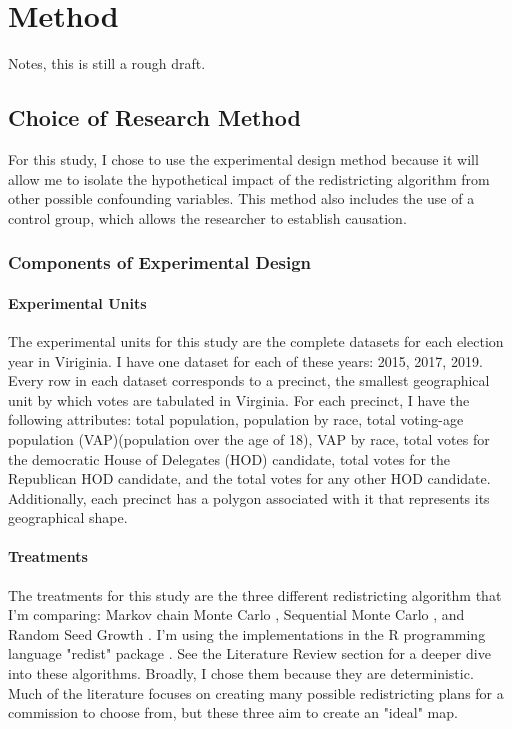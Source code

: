 \section{Method}

Notes, this is still a rough draft. 

\subsection{Choice of Research Method}

For this study, I chose to use the experimental design method because it will allow me to isolate the hypothetical impact of the redistricting algorithm from other possible confounding variables. This method also includes the use of a control group, which allows the researcher to establish causation. 

\subsubsection{Components of Experimental Design}

\paragraph{Experimental Units}

The experimental units for this study are the complete datasets for each election year in Viriginia. I have one dataset for each of these years: 2015, 2017, 2019. Every row in each dataset corresponds to a precinct, the smallest geographical unit by which votes are tabulated in Virginia. For each precinct, I have the following attributes: total population, population by race, total voting-age population (VAP)(population over the age of 18), VAP by race, total votes for the democratic House of Delegates (HOD) candidate, total votes for the Republican HOD candidate, and the total votes for any other HOD candidate. Additionally, each precinct has a polygon associated with it that represents its geographical shape. 

\paragraph{Treatments}

The treatments for this study are the three different redistricting algorithm that I'm comparing: Markov chain Monte Carlo \parencite{fifield2020}, Sequential Monte Carlo \parencite{mccartan2020}, and Random Seed Growth \parencite{chen2013}. I'm using the implementations in the R programming language "redist" package \parencite{fifield2020d}. See the Literature Review section for a deeper dive into these algorithms. Broadly, I chose them because they are deterministic. Much of the literature focuses on creating many possible redistricting plans for a commission to choose from, but these three aim to create an "ideal" map. 

